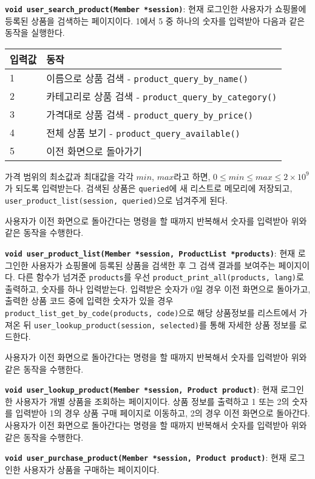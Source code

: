 \documentclass[runningheads]{llncs}
\begin{document}
\textbf{\texttt{void user_search_product(Member *session)}}: 현재 로그인한 사용자가 쇼핑몰에 등록된 상품을 검색하는 페이지이다. 1에서 5 중 하나의 숫자를 입력받아 다음과 같은 동작을 실행한다.

\begin{tabularx}{\textwidth}{l|X}
	\hline
		입력값	& 동작 \\
	\hline
		1 & 이름으로 상품 검색 - \texttt{product_query_by_name()} \\
		2 & 카테고리로 상품 검색 - \texttt{product_query_by_category()} \\
		3 & 가격대로 상품 검색 - \texttt{product_query_by_price()} \\
		4 & 전체 상품 보기 - \texttt{product_query_available()} \\
		5 & 이전 화면으로 돌아가기 \\
	\hline
\end{tabularx}

가격 범위의 최소값과 최대값을 각각 $min$, $max$라고 하면, $0 \leq min \leq max \leq 2 \times {10}^{9}$가 되도록 입력받는다. 검색된 상품은 \texttt{queried}에 새 리스트로 메모리에 저장되고, \texttt{user_product_list(session, queried)}으로 넘겨주게 된다.

사용자가 이전 화면으로 돌아간다는 명령을 할 때까지 반복해서 숫자를 입력받아 위와 같은 동작을 수행한다.

\textbf{\texttt{void user_product_list(Member *session, ProductList *products)}}: 현재 로그인한 사용자가 쇼핑몰에 등록된 상품을 검색한 후 그 검색 결과를 보여주는 페이지이다. 다른 함수가 넘겨준 \texttt{products}를 우선 \texttt{product_print_all(products, lang)}로 출력하고, 숫자를 하나 입력받는다. 입력받은 숫자가 0일 경우 이전 화면으로 돌아가고, 출력한 상품 코드 중에 입력한 숫자가 있을 경우 \texttt{product_list_get_by_code(products, code)}으로 해당 상품정보를 리스트에서 가져온 뒤 \texttt{user_lookup_product(session, selected)}를 통해 자세한 상품 정보를 로드한다.

사용자가 이전 화면으로 돌아간다는 명령을 할 때까지 반복해서 숫자를 입력받아 위와 같은 동작을 수행한다.

\textbf{\texttt{void user_lookup_product(Member *session, Product product)}}: 현재 로그인한 사용자가 개별 상품을 조회하는 페이지이다. 상품 정보를 출력하고 1 또는 2의 숫자를 입력받아 1의 경우 상품 구매 페이지로 이동하고, 2의 경우 이전 화면으로 돌아간다. 사용자가 이전 화면으로 돌아간다는 명령을 할 때까지 반복해서 숫자를 입력받아 위와 같은 동작을 수행한다.

\textbf{\texttt{void user_purchase_product(Member *session, Product product)}}: 현재 로그인한 사용자가 상품을 구매하는 페이지이다.
\end{document}
